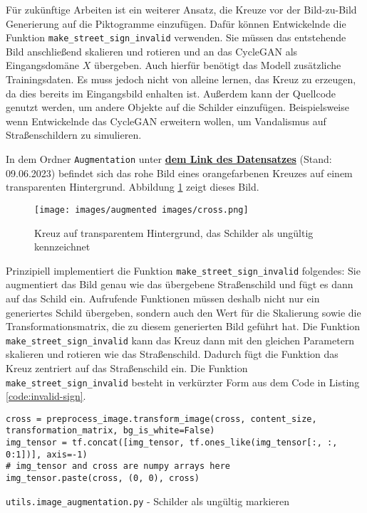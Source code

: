 Für zukünftige Arbeiten ist ein weiterer Ansatz, die Kreuze vor der Bild-zu-Bild Generierung auf die Piktogramme einzufügen. Dafür können Entwickelnde die Funktion \texttt{make_street_sign_invalid} verwenden. Sie müssen das entstehende Bild anschließend skalieren und rotieren und an das \ac{CycleGAN} als Eingangsdomäne $X$ übergeben. Auch hierfür benötigt das Modell zusätzliche Trainingsdaten. Es muss jedoch nicht von alleine lernen, das Kreuz zu erzeugen, da dies bereits im Eingangsbild enhalten ist. Außerdem kann der Quellcode genutzt werden, um andere Objekte auf die Schilder einzufügen. Beispielsweise wenn Entwickelnde das \ac{CycleGAN} erweitern wollen, um Vandalismus auf Straßenschildern zu simulieren.

In dem Ordner \texttt{Augmentation} unter \href{https://drive.google.com/drive/u/1/folders/1UlZNFEDLymyMFw2BJZcfB2toAIlTVwGb}{\textbf{dem Link des Datensatzes}} (Stand: 09.06.2023) befindet sich das rohe Bild eines orangefarbenen Kreuzes auf einem transparenten Hintergrund. Abbildung \ref{fig:cross} zeigt dieses Bild.
\begin{figure}[h]
	\centering
	\texttt{[image: images/augmented images/cross.png]}
	\caption{Kreuz auf transparentem Hintergrund, das Schilder als ungültig kennzeichnet}
	\label{fig:cross}
\end{figure} 
Prinzipiell implementiert die Funktion \texttt{make_street_sign_invalid} folgendes: Sie augmentiert das Bild genau wie das übergebene Straßenschild und fügt es dann auf das Schild ein. Aufrufende Funktionen müssen deshalb nicht nur ein generiertes Schild übergeben, sondern auch den Wert für die Skalierung sowie die Transformationsmatrix, die zu diesem generierten Bild geführt hat. Die Funktion \texttt{make_street_sign_invalid} kann das Kreuz dann mit den gleichen Parametern skalieren und rotieren wie das Straßenschild. Dadurch fügt die Funktion das Kreuz zentriert auf das Straßenschild ein. Die Funktion \texttt{make_street_sign_invalid} besteht in verkürzter Form aus dem Code in Listing \ref{code:invalid-sign}.

\begin{code}
	\begin{verbatim}
cross = preprocess_image.transform_image(cross, content_size, transformation_matrix, bg_is_white=False)
img_tensor = tf.concat([img_tensor, tf.ones_like(img_tensor[:, :, 0:1])], axis=-1)
# img_tensor and cross are numpy arrays here
img_tensor.paste(cross, (0, 0), cross)
	\end{verbatim}
	\caption{\lstinline[language=python]{utils.image_augmentation.py} - Schilder als ungültig markieren}
	\label{code:invalid-sign}
\end{code}

